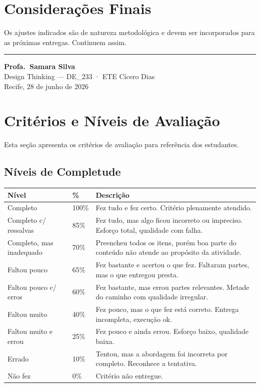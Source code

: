 \documentclass[
  sigconf,
  nonacm, %
  language=portuguese
]{acmart}
\begin{document}
\section{Considerações Finais}

Os ajustes indicados são de natureza metodológica e devem ser
incorporados para as próximas entregas.
Continuem assim.


\vspace{1.5em}
\noindent\rule{\linewidth}{0.4pt}

\begin{flushright}
\textbf{Profa.\ Samara Silva}\\
{\small\color{cmuted} Design Thinking --- DE\_233 · ETE Cícero Dias}\\
{\small\color{cmuted} Recife, 28 de junho de 2026}
\end{flushright}


\appendix
\onecolumn
\section{Critérios e Níveis de Avaliação}

Esta seção apresenta os critérios de avaliação para referência dos estudantes.

\subsection{Níveis de Completude}

\begin{tabularx}{\linewidth}{@{} p{4cm} p{1.5cm} X @{}}
\toprule
\textbf{Nível} & \textbf{\%} & \textbf{Descrição} \\
\midrule
Completo & 100\% & Fez tudo e fez certo. Critério plenamente atendido. \\
Completo c/ ressalvas & 85\% & Fez tudo, mas algo ficou incorreto ou impreciso. Esforço total, qualidade com falha. \\
Completo, mas inadequado & 70\% & Preencheu todos os itens, porém boa parte do conteúdo não atende ao propósito da atividade. \\
Faltou pouco & 65\% & Fez bastante e acertou o que fez. Faltaram partes, mas o que entregou presta. \\
Faltou pouco c/ erros & 60\% & Fez bastante, mas errou partes relevantes. Metade do caminho com qualidade irregular. \\
Faltou muito & 40\% & Fez pouco, mas o que fez está correto. Entrega incompleta, execução ok. \\
Faltou muito e errou & 25\% & Fez pouco e ainda errou. Esforço baixo, qualidade baixa. \\
Errado & 10\% & Tentou, mas a abordagem foi incorreta por completo. Reconhece a tentativa. \\
Não fez & 0\% & Critério não entregue. \\
\bottomrule
\end{tabularx}
\end{document}
